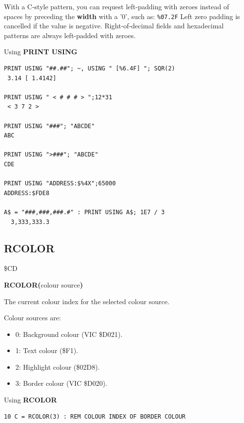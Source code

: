 \begin{description}[leftmargin=2cm,style=nextline]
                  With a C-style pattern, you can request left-padding with zeroes instead of spaces by preceding the {\bf width} with a '0', such as: \texttt{\%07.2F} Left zero padding is cancelled if the value is negative. Right-of-decimal fields and hexadecimal patterns are always left-padded with zeroes.

\newpage
\item [Examples:] Using {\bf PRINT USING}

\begin{tcolorbox}[colback=black,coltext=white]
\verbatimfont{\codefont}
\begin{verbatim}
PRINT USING "##.##"; ~, USING " [%6.4F] "; SQR(2)
 3.14 [ 1.4142]

PRINT USING " < # # # > ";12*31
 < 3 7 2 >

PRINT USING "###"; "ABCDE"
ABC

PRINT USING ">###"; "ABCDE"
CDE

PRINT USING "ADDRESS:$%4X";65000
ADDRESS:$FDE8

A$ = "###,###,###.#" : PRINT USING A$; 1E7 / 3
  3,333,333.3
\end{verbatim}
\end{tcolorbox}
\end{description}


\newpage
\subsection{RCOLOR}
\begin{description}[leftmargin=2cm,style=nextline]
\item [Token:]    \$CD

\item [Format:]   {\bf RCOLOR(}colour source{\bf)}

\item [Returns:]  The current colour index for the selected colour source.

                  Colour sources are:
                  \begin{itemize}
                     \item 0: Background colour (VIC \$D021).
                     \item 1: Text colour (\$F1).
                     \item 2: Highlight colour (\$02D8).
                     \item 3: Border colour (VIC \$D020).
                  \end{itemize}

\item [Example:]  Using {\bf RCOLOR}

\begin{tcolorbox}[colback=black,coltext=white]
\verbatimfont{\codefont}
\begin{verbatim}
10 C = RCOLOR(3) : REM COLOUR INDEX OF BORDER COLOUR
\end{verbatim}
\end{tcolorbox}
\end{description}

